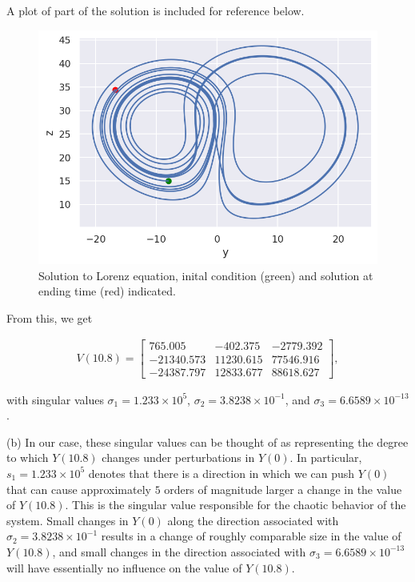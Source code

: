 \documentclass[12pt]{article}
\newcommand{\s}{\sigma}
\begin{document}
A plot of part of the solution is included for reference below.
\\

\begin{figure}[h]
\centering
\includegraphics[width=.8\textwidth]{p2.png}
\caption{Solution to Lorenz equation, inital condition (green) and solution at ending time (red) indicated.}
\end{figure}

From this, we get

\begin{align*}
V(10.8) =
\begin{bmatrix}
765.005 & -402.375 & -2779.392 \\
-21340.573 & 11230.615 & 77546.916 \\
-24387.797 & 12833.677 & 88618.627
\end{bmatrix},
\end{align*}

with singular values $\s_1 = 1.233\times10^5$, $\s_2 = 3.8238\times10^{-1}$, and $\s_3 = 6.6589\times10^{-13}$.
\\

\newpage

(b) In our case, these singular values can be thought of as representing the degree to which $Y(10.8)$ changes under perturbations in $Y(0)$. In particular, $s_1 = 1.233\times10^5$ denotes that there is a direction in which we can push $Y(0)$ that can cause approximately $5$ orders of magnitude larger a change in the value of $Y(10.8)$. This is the singular value responsible for the chaotic behavior of the system. Small changes in $Y(0)$ along the direction associated with $\sigma_2 = 3.8238\times10^{-1}$ results in a change of roughly comparable size in the value of $Y(10.8)$, and small changes in the direction associated with $\s_3 = 6.6589\times10^{-13}$ will have essentially no influence on the value of $Y(10.8)$.
\end{document}
